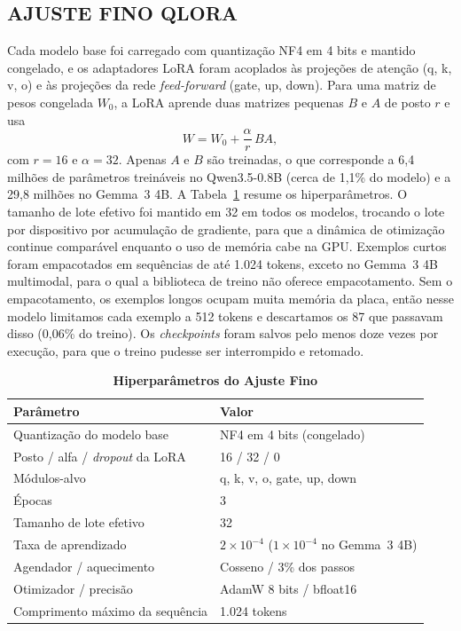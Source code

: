 \documentclass{ieeeaccess}
\begin{document}
\subsection{AJUSTE FINO QLORA}
Cada modelo base foi carregado com quantiza\c{c}\~ao NF4 em 4 bits e mantido congelado, e os adaptadores LoRA foram acoplados \`as proje\c{c}\~oes de aten\c{c}\~ao (q, k, v, o) e \`as proje\c{c}\~oes da rede \emph{feed-forward} (gate, up, down). Para uma matriz de pesos congelada $W_{0}$, a LoRA aprende duas matrizes pequenas $B$ e $A$ de posto $r$ e usa
\begin{equation}
W = W_{0} + \frac{\alpha}{r}\,BA,
\label{eq:lora}
\end{equation}
com $r = 16$ e $\alpha = 32$. Apenas $A$ e $B$ s\~ao treinadas, o que corresponde a 6,4 milh\~oes de par\^ametros trein\'aveis no Qwen3.5-0.8B (cerca de 1,1\% do modelo) e a 29,8 milh\~oes no Gemma~3 4B. A Tabela~\ref{tab:hiper} resume os hiperpar\^ametros. O tamanho de lote efetivo foi mantido em 32 em todos os modelos, trocando o lote por dispositivo por acumula\c{c}\~ao de gradiente, para que a din\^amica de otimiza\c{c}\~ao continue compar\'avel enquanto o uso de mem\'oria cabe na GPU. Exemplos curtos foram empacotados em sequ\^encias de at\'e 1.024 tokens, exceto no Gemma~3 4B multimodal, para o qual a biblioteca de treino n\~ao oferece empacotamento. Sem o empacotamento, os exemplos longos ocupam muita mem\'oria da placa, ent\~ao nesse modelo limitamos cada exemplo a 512 tokens e descartamos os 87 que passavam disso (0,06\% do treino). Os \emph{checkpoints} foram salvos pelo menos doze vezes por execu\c{c}\~ao, para que o treino pudesse ser interrompido e retomado.

\begin{table}[!t]
\caption{\textbf{Hiperpar\^ametros do Ajuste Fino}}
\label{tab:hiper}
\setlength{\tabcolsep}{3pt}
\begin{tabular}{p{110pt}p{125pt}}
\hline
\textbf{Par\^ametro} & \textbf{Valor} \\
\hline
Quantiza\c{c}\~ao do modelo base & NF4 em 4 bits (congelado) \\
Posto / alfa / \emph{dropout} da LoRA & 16 / 32 / 0 \\
M\'odulos-alvo & q, k, v, o, gate, up, down \\
\'Epocas & 3 \\
Tamanho de lote efetivo & 32 \\
Taxa de aprendizado & $2\times10^{-4}$ ($1\times10^{-4}$ no Gemma~3 4B) \\
Agendador / aquecimento & Cosseno / 3\% dos passos \\
Otimizador / precis\~ao & AdamW 8 bits / bfloat16 \\
Comprimento m\'aximo da sequ\^encia & 1.024 tokens \\
\hline
\end{tabular}
\end{table}
\end{document}
